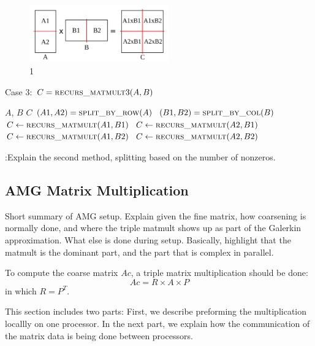 \begin{figure}[tbh]
 \centering
 \includegraphics[width=6cm,height=2.5cm]{./figures/case3_001.pdf}
 \caption{1}
 \label{fig:case3}
\end{figure}

\begin{algorithm}[H] 
  \caption{Case 3: $C = \textsc{recurs\_matmult}3(A, B)$} \label{alg:case3} 
  \begin{algorithmic}[1]
    \Require $A$, $B$
    \Ensure  $C$
    \State $(A1, A2) = \textsc{split\_by\_row}(A)$
    \State $(B1, B2) = \textsc{split\_by\_col}(B)$
    \State $C \leftarrow \textsc{recurs\_matmult}(A1,B1)$
    \State $C \leftarrow \textsc{recurs\_matmult}(A2,B1)$
    \State $C \leftarrow \textsc{recurs\_matmult}(A1,B2)$
    \State $C \leftarrow \textsc{recurs\_matmult}(A2,B2)$
  \end{algorithmic}
\end{algorithm}

\mr:{Explain the second method, splitting based on the number of nonzeros.}


\subsection{AMG Matrix Multiplication}
\label{sec:amg}

Short summary of AMG setup. Explain given the fine matrix, how coarsening is normally done, and where the triple matmult shows up as part of the Galerkin approximation. What else is done during setup. Basically, highlight that the matmult is the dominant part, and the part that is complex in parallel. 

To compute the coarse matrix $Ac$, a triple matrix multiplication should be done:
\begin{equation}
 Ac = R \times A \times P
\end{equation}
in which $R = P^T$.

This section includes two parts: First, we describe preforming the multiplication locallly on one processor. In the next part, we explain how the communication of the matrix data is being done between processors.


